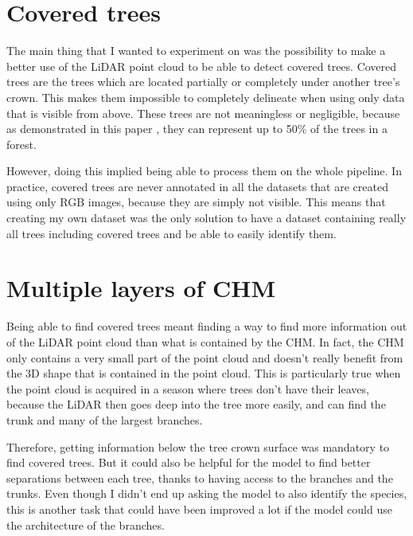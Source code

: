 \documentclass[
]{report}
\begin{document}
\section{Covered trees}\label{sec-obj-covered_trees}

The main thing that I wanted to experiment on was the possibility to
make a better use of the LiDAR point cloud to be able to detect covered
trees. Covered trees are the trees which are located partially or
completely under another tree's crown. This makes them impossible to
completely delineate when using only data that is visible from above.
These trees are not meaningless or negligible, because as demonstrated
in this paper \autocite{lidar_benchmark_2}, they can represent up to
50\% of the trees in a forest.

However, doing this implied being able to process them on the whole
pipeline. In practice, covered trees are never annotated in all the
datasets that are created using only RGB images, because they are simply
not visible. This means that creating my own dataset was the only
solution to have a dataset containing really all trees including covered
trees and be able to easily identify them.

\section{Multiple layers of CHM}\label{multiple-layers-of-chm}

Being able to find covered trees meant finding a way to find more
information out of the LiDAR point cloud than what is contained by the
CHM. In fact, the CHM only contains a very small part of the point cloud
and doesn't really benefit from the 3D shape that is contained in the
point cloud. This is particularly true when the point cloud is acquired
in a season where trees don't have their leaves, because the LiDAR then
goes deep into the tree more easily, and can find the trunk and many of
the largest branches.

Therefore, getting information below the tree crown surface was
mandatory to find covered trees. But it could also be helpful for the
model to find better separations between each tree, thanks to having
access to the branches and the trunks. Even though I didn't end up
asking the model to also identify the species, this is another task that
could have been improved a lot if the model could use the architecture
of the branches.
\end{document}
